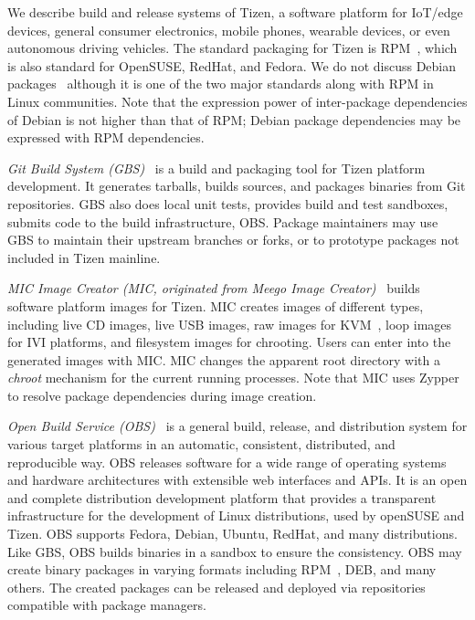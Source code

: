We describe build and release systems of Tizen, a software platform for IoT/edge devices, general consumer electronics, mobile phones, wearable devices, or even autonomous driving vehicles.
The standard packaging for Tizen is RPM~\cite{foster2003red}, which is also standard for OpenSUSE, RedHat, and Fedora.
We do not discuss Debian packages~\cite{blackman2000debian} although it is one of the two major standards along with RPM in Linux communities.
Note that the expression power of inter-package dependencies of Debian is not higher than that of RPM; Debian package dependencies may be expressed with RPM dependencies.

\textit{Git Build System (GBS)}~\cite{17GBS2014TizenURL} is a build and packaging tool for Tizen platform development.
It generates tarballs, builds sources, and packages binaries from Git repositories.
GBS also does local unit tests, provides build and test sandboxes, submits code to the build infrastructure, OBS.
Package maintainers may use GBS to maintain their upstream branches or forks, or to prototype packages not included in Tizen mainline.


\textit{MIC Image Creator (MIC, originated from Meego Image Creator)}~\cite{18MIC2014TizenURL} builds software platform images for Tizen.
MIC creates images of different types, including live CD images, live USB images, raw images for KVM~\cite{21Kivity07kvm}, loop images for IVI platforms, and filesystem images for chrooting.
Users can enter into the generated images with MIC. MIC changes the apparent root directory with a \textit{chroot} mechanism for the current running processes.
Note that MIC uses Zypper~\cite{20Zypper_URL} to resolve package dependencies during image creation.


\textit{Open Build Service (OBS)}~\cite{19OBS_URL} is a general build, release, and distribution system for various target platforms in an automatic, consistent, distributed, and reproducible way.
OBS releases software for a wide range of operating systems and hardware architectures with extensible web interfaces and APIs.
It is an open and complete distribution development platform that provides a transparent infrastructure for the development of Linux distributions, used by openSUSE and Tizen.
OBS supports Fedora, Debian, Ubuntu, RedHat, and many distributions.
Like GBS, OBS builds binaries in a sandbox to ensure the consistency.
OBS may create binary packages in varying formats including RPM~\cite{22foster2002red}, DEB, and many others.
The created packages can be released and deployed via repositories compatible with package managers.


